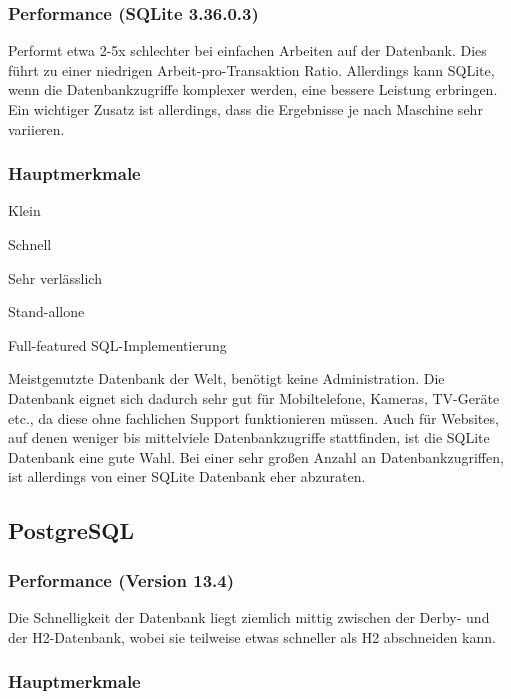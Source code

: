 \subsubsection{Performance (SQLite 3.36.0.3)}
Performt etwa 2-5x schlechter bei einfachen Arbeiten auf der Datenbank. Dies führt zu einer niedrigen Arbeit-pro-Transaktion Ratio. Allerdings kann SQLite, wenn die Datenbankzugriffe komplexer werden, eine bessere Leistung erbringen. Ein wichtiger Zusatz ist allerdings, dass die Ergebnisse je nach Maschine sehr variieren.
 
\subsubsection{Hauptmerkmale}
 
\begin{compactitem}
    \item Klein
    \item Schnell        
    \item Sehr verlässlich
    \item Stand-allone
    \item Full-featured SQL-Implementierung
\end{compactitem}
 
Meistgenutzte Datenbank der Welt, benötigt keine Administration. Die Datenbank eignet sich dadurch sehr gut für Mobiltelefone, Kameras, TV-Geräte etc., da diese ohne fachlichen Support funktionieren müssen. Auch für Websites, auf denen weniger bis mittelviele Datenbankzugriffe stattfinden, ist die SQLite Datenbank eine gute Wahl. Bei einer sehr großen Anzahl an Datenbankzugriffen, ist allerdings von einer SQLite Datenbank eher abzuraten.
 
\subsection{PostgreSQL}
\subsubsection{Performance (Version 13.4)}
Die Schnelligkeit der Datenbank liegt ziemlich mittig zwischen der Derby- und der H2-Datenbank, wobei sie teilweise etwas schneller als H2 abschneiden kann.
 
\subsubsection{Hauptmerkmale}
 
